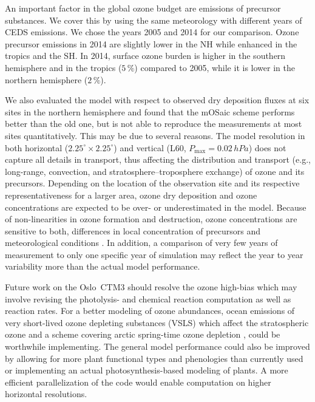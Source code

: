 \documentclass[gmd, manuscript]{copernicus}
\begin{document}

An important factor in the global ozone budget are emissions of precursor substances. We cover this by using the same meteorology with different years of CEDS emissions. We chose the years 2005 and 2014 for our comparison. Ozone precursor emissions in 2014 are slightly lower in the NH while enhanced in the tropics and the SH. In 2014, surface ozone burden is higher in the southern hemisphere and in the tropics ($5\,\unit{\%}$) compared to 2005, while it is lower in the northern hemisphere ($2\,\unit{\%}$).

We also evaluated the model with respect to observed dry deposition fluxes at six sites in the northern hemisphere and found that the mOSaic scheme performs better than the old one, but is not able to reproduce the measurements at most sites quantitatively. This may be due to several reasons. The model resolution in both horizontal ($2.25^\circ\times 2.25^\circ$) and vertical (L60, $P_\text{max}=0.02\,\unit{hPa}$) does not capture all details in transport, thus affecting the distribution and transport (e.g., long-range, convection, and stratosphere--troposphere exchange) of ozone and its precursors. Depending on the location of the observation site and its respective representativeness for a larger area, ozone dry deposition and ozone concentrations are expected to be over- or underestimated in the model. Because of non-linearities in ozone formation and destruction, ozone concentrations are sensitive to both, differences in local concentration of precursors and meteorological conditions \citep{JGR:Jin2013}. In addition, a comparison of very few years of measurement to only one specific year of simulation may reflect the year to year variability more than the actual model performance.

Future work on the Oslo~CTM3 should resolve the ozone high-bias which may involve revising the photolysis- and chemical reaction computation as well as reaction rates. For a better modeling of ozone abundances, ocean emissions of very short-lived ozone depleting substances (VSLS) \citep{JGR:Warwick2006, ACP:Ziska2013} which affect the stratospheric ozone \citep{ACP:Hossaini2016, ACP:Falk2017} and a scheme covering arctic spring-time ozone depletion \citep[e.g.,][]{ACP:Yang2010, ACP:Toyota2011, GMD:Falk2018}, could be worthwhile implementing. The general model performance could also be improved by allowing for more plant functional types and phenologies than currently used or implementing an actual photosynthesis-based modeling of plants. A more efficient parallelization of the code would enable computation on higher horizontal resolutions.
\end{document}
